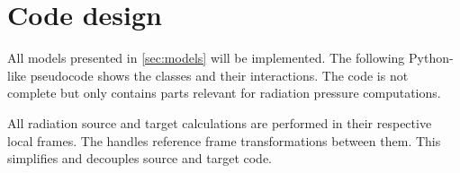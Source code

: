 \documentclass[parskip=full,DIV=15]{scrartcl}
\begin{document}
\section{Code design}
All models presented in \cref{sec:models} will be implemented. The following Python-like pseudocode shows the classes and their interactions. The code is not complete but only contains parts relevant for radiation pressure computations.

All radiation source and target calculations are performed in their respective local frames. The  handles reference frame transformations between them. This simplifies and decouples source and target code.

\inputminted{python}{code_design.py}
\end{document}
